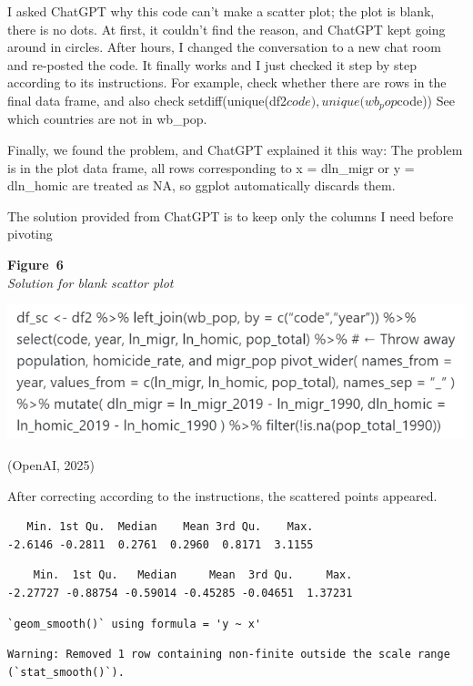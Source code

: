 \documentclass[
  man,
  floatsintext,
  longtable,
  nolmodern,
  notxfonts,
  notimes,
  colorlinks=true,linkcolor=blue,citecolor=blue,urlcolor=blue]{apa7}
\begin{document}
I asked ChatGPT why this code can't make a scatter plot; the plot is
blank, there is no dots. At first, it couldn't find the reason, and
ChatGPT kept going around in circles. After hours, I changed the
conversation to a new chat room and re-posted the code. It finally works
and I just checked it step by step according to its instructions. For
example, check whether there are rows in the final data frame, and also
check setdiff(unique(df2\(code), unique(wb_pop\)code)) See which
countries are not in wb\_pop.

Finally, we found the problem, and ChatGPT explained it this way: The
problem is in the plot data frame, all rows corresponding to x =
dln\_migr or y = dln\_homic are treated as NA, so ggplot automatically
discards them.

The solution provided from ChatGPT is to keep only the columns I need
before pivoting

\label{fig:s1}
\textbf{Figure~6}\\
\emph{Solution for blank scattor plot}

\begin{center}
\includegraphics[width=0.8\linewidth,height=\textheight,keepaspectratio]{fig/s1.png}
\end{center}

(OpenAI, 2025)

After correcting according to the instructions, the scattered points
appeared.

\begin{verbatim}
   Min. 1st Qu.  Median    Mean 3rd Qu.    Max. 
-2.6146 -0.2811  0.2761  0.2960  0.8171  3.1155 
\end{verbatim}

\begin{verbatim}
    Min.  1st Qu.   Median     Mean  3rd Qu.     Max. 
-2.27727 -0.88754 -0.59014 -0.45285 -0.04651  1.37231 
\end{verbatim}

\begin{verbatim}
`geom_smooth()` using formula = 'y ~ x'
\end{verbatim}

\begin{verbatim}
Warning: Removed 1 row containing non-finite outside the scale range
(`stat_smooth()`).
\end{verbatim}
\end{document}
